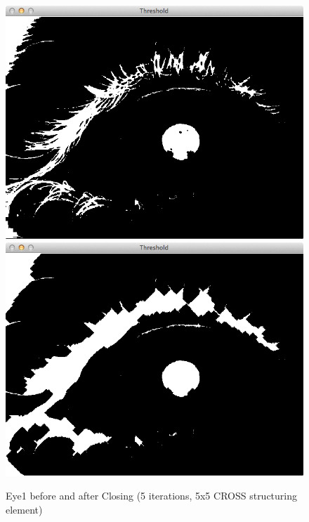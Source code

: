 \documentclass[a4paper,11pt]{article}
\begin{document}
\begin{figure}[H]
  \centering
  \includegraphics[scale=0.2]{eye1_close_5}
  \includegraphics[scale=0.2]{eye1_no_morph}
  \caption{Eye1 before and after Closing (5 iterations, 5x5 CROSS structuring element)}
  \label{fig:morph}
\end{figure}
\end{document}
